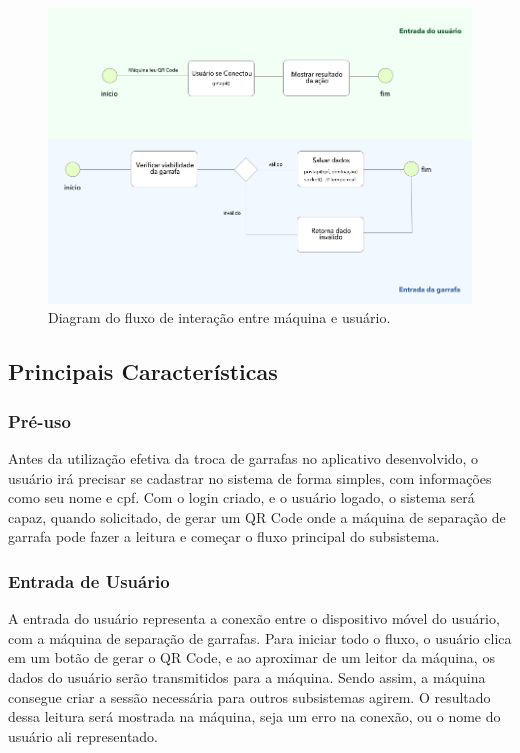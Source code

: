 \begin{figure}[!ht]
	\centering
		\includegraphics[scale=0.5]{figuras/representacao}
	\caption{Diagram do fluxo de interação entre máquina e usuário.}
\end{figure}

\subsection{Principais Características}

\subsubsection{Pré-uso}
    Antes da utilização efetiva da troca de garrafas no aplicativo desenvolvido, o usuário irá precisar se cadastrar no sistema de forma simples, com informações como seu nome e cpf. Com o login criado, e o usuário logado, o sistema será capaz, quando solicitado, de gerar um QR Code onde a máquina de separação de garrafa pode fazer a leitura e começar o fluxo principal do subsistema.

\subsubsection{Entrada de Usuário}
    A entrada do usuário representa a conexão entre o dispositivo móvel do usuário, com a máquina de separação de garrafas. Para iniciar todo o fluxo, o usuário clica em um botão de gerar o QR Code, e ao aproximar de um leitor da máquina, os dados do usuário serão transmitidos para a máquina. Sendo assim, a máquina consegue criar a sessão necessária para outros subsistemas agirem. O resultado dessa leitura será mostrada na máquina, seja um erro na conexão, ou o nome do usuário ali representado.

